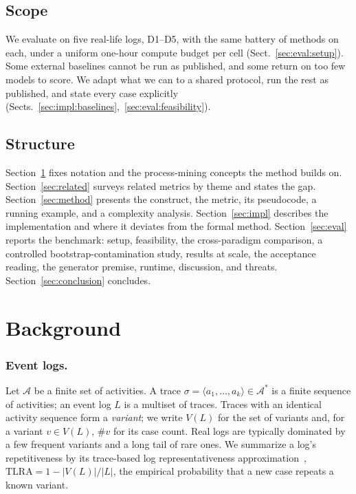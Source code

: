 \documentclass[runningheads]{llncs}
\newcommand{\chg}[1]{\textcolor{chgblue}{#1}}
\begin{document}
\subsection{Scope}
\label{sec:scope}
\chg{We evaluate on five real-life logs, D1--D5, with the same battery of methods on each, under a uniform one-hour compute budget per cell (Sect.~\ref{sec:eval:setup}).} Some external baselines cannot be run as published, and some return on too few models to score. We adapt what we can to a shared protocol, run the rest as published, and state every case explicitly (Sects.~\ref{sec:impl:baselines},~\ref{sec:eval:feasibility}).

\subsection{Structure}
Section~\ref{sec:background} fixes notation and the process-mining concepts the method builds on. Section~\ref{sec:related} surveys related metrics by theme and states the gap. Section~\ref{sec:method} presents the construct, the metric, its pseudocode, a running example, and a complexity analysis. Section~\ref{sec:impl} describes the implementation and where it deviates from the formal method. Section~\ref{sec:eval} reports the benchmark: setup, feasibility, \chg{the cross-paradigm comparison, a controlled bootstrap-contamination study, results at scale, the acceptance reading, the generator premise, runtime, discussion, and threats}. Section~\ref{sec:conclusion} concludes.

\section{Background}
\label{sec:background}

\subsubsection{Event logs.}
Let $\mathcal{A}$ be a finite set of activities. A trace $\sigma=\langle a_1,\dots,a_k\rangle\in\mathcal{A}^{*}$ is a finite sequence of activities; an event log $L$ is a multiset of traces. Traces with an identical activity sequence form a \emph{variant}; we write $V(L)$ for the set of variants and, for a variant $v\in V(L)$, $\#v$ for its case count. Real logs are typically dominated by a few frequent variants and a long tail of rare ones. We summarize a log's repetitiveness by \chg{its trace-based log representativeness approximation~\cite{karunaratne2024representativeness},} $\mathrm{TLRA}=1-|V(L)|/|L|$, the empirical probability that a new case repeats a known variant.
\end{document}
